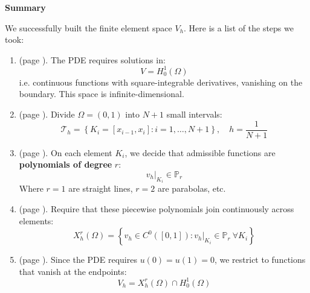 \newpage

\begin{flushleft}
    \textcolor{Green3}{ \textbf{Summary}}
\end{flushleft}
We successfully built the finite element space $V_h$. Here is a list of the steps we took:
\begin{enumerate}
    \item {} (page \pageref{subsubsection: Weak formulation}). The PDE requires solutions in:
    \begin{equation*}
        V = H^1_0(\Omega)
    \end{equation*}
    i.e. continuous functions with square-integrable derivatives, vanishing on the boundary. This space is infinite-dimensional.
    

    \item {} (page \pageref{def: Mesh}). Divide $\Omega=(0,1)$ into $N+1$ small intervals:
    \begin{equation*}
        \mathcal{T}_h = \left\{K_i = [x_{i-1}, x_i] : i=1,\dots,N+1\right\}, \quad h=\dfrac{1}{N+1}
    \end{equation*}


    \item {} (page \pageref{label: why do we approximate with polynomials on each piece}). On each element $K_i$, we decide that admissible functions are \textbf{polynomials of degree} $r$:
    \begin{equation*}
        v_h|_{K_i} \in \mathbb{P}_r
    \end{equation*}
    Where $r=1$ are straight lines, $r=2$ are parabolas, etc.


    \item {} (page \pageref{eq: Poisson 1D - Enforce continuity}). Require that these piecewise polynomials join continuously across elements:
    \begin{equation*}
        X_h^r(\Omega) = \left\{ v_h \in C^0([0,1]) : v_h|_{K_i} \in \mathbb{P}_r \ \forall K_i\right\}
    \end{equation*}


    \item {} (page \pageref{eq: Poisson 1D - Impose boundary conditions}). Since the PDE requires $u(0)=u(1)=0$, we restrict to functions that vanish at the endpoints:
    \begin{equation*}
        V_h = X_h^r(\Omega) \cap H^1_0(\Omega)
    \end{equation*}



\end{enumerate}
